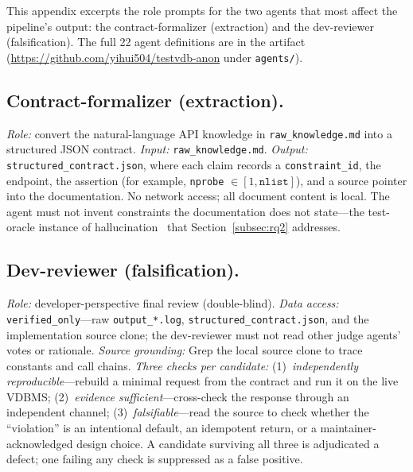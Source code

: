 \documentclass[sigconf]{acmart}
\begin{document}
This appendix excerpts the role prompts for the two agents that most affect the pipeline's output: the contract-formalizer (extraction) and the dev-reviewer (falsification). The full 22 agent definitions are in the artifact (\url{https://github.com/yihui504/testvdb-anon} under \texttt{agents/}).

\subsection*{Contract-formalizer (extraction).}
\emph{Role:} convert the natural-language API knowledge in \texttt{raw\_knowledge.md} into a structured JSON contract. \emph{Input:} \texttt{raw\_knowledge.md}. \emph{Output:} \texttt{structured\_contract.json}, where each claim records a \texttt{constraint\_id}, the endpoint, the assertion (for example, \texttt{nprobe} $\in [1, \texttt{nlist}]$), and a source pointer into the documentation. No network access; all document content is local. The agent must not invent constraints the documentation does not state---the test-oracle instance of hallucination~\cite{ji23hall} that Section~\ref{subsec:rq2} addresses.

\subsection*{Dev-reviewer (falsification).}
\emph{Role:} developer-perspective final review (double-blind). \emph{Data access:} \texttt{verified\_only}---raw \texttt{output\_*.log}, \texttt{structured\_contract.json}, and the implementation source clone; the dev-reviewer must not read other judge agents' votes or rationale. \emph{Source grounding:} Grep the local source clone to trace constants and call chains. \emph{Three checks per candidate:} (1)~\emph{independently reproducible}---rebuild a minimal request from the contract and run it on the live VDBMS; (2)~\emph{evidence sufficient}---cross-check the response through an independent channel; (3)~\emph{falsifiable}---read the source to check whether the ``violation'' is an intentional default, an idempotent return, or a maintainer-acknowledged design choice. A candidate surviving all three is adjudicated a defect; one failing any check is suppressed as a false positive.
\end{document}

